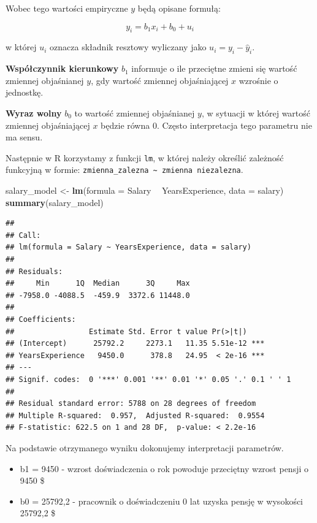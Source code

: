 \documentclass[
]{book}
\newenvironment{Shaded}{\begin{snugshade}}{\end{snugshade}}
\newcommand{\DataTypeTok}[1]{\textcolor[rgb]{0.13,0.29,0.53}{#1}}
\newcommand{\KeywordTok}[1]{\textcolor[rgb]{0.13,0.29,0.53}{\textbf{#1}}}
\newcommand{\NormalTok}[1]{#1}
\newcommand{\OperatorTok}[1]{\textcolor[rgb]{0.81,0.36,0.00}{\textbf{#1}}}
\newcommand{\StringTok}[1]{\textcolor[rgb]{0.31,0.60,0.02}{#1}}
\providecommand{\tightlist}{%
  \setlength{\itemsep}{0pt}\setlength{\parskip}{0pt}}
\begin{document}
Wobec tego wartości empiryczne \(y\) będą opisane formułą:

\[y_{i}=b_{1}x_{i}+b_{0}+u_{i}\]

w której \(u_i\) oznacza składnik resztowy wyliczany jako \(u_{i}=y_{i}-\hat{y}_{i}\).

\textbf{Współczynnik kierunkowy} \(b_1\) informuje o ile przeciętne zmieni się wartość zmiennej objaśnianej \(y\), gdy wartość zmiennej objaśniającej \(x\) wzrośnie o jednostkę.

\textbf{Wyraz wolny} \(b_0\) to wartość zmiennej objaśnianej \(y\), w sytuacji w której wartość zmiennej objaśniającej \(x\) będzie równa 0. Często interpretacja tego parametru nie ma sensu.

Następnie w R korzystamy z funkcji \texttt{lm}, w której należy określić zależność funkcyjną w formie: \texttt{zmienna\_zalezna\ \textasciitilde{}\ zmienna\ niezalezna}.

\begin{Shaded}
\begin{Highlighting}[]
\NormalTok{salary_model <-}\StringTok{ }\KeywordTok{lm}\NormalTok{(}\DataTypeTok{formula =}\NormalTok{ Salary }\OperatorTok{~}\StringTok{ }\NormalTok{YearsExperience, }\DataTypeTok{data =}\NormalTok{ salary)}
\KeywordTok{summary}\NormalTok{(salary_model)}
\end{Highlighting}
\end{Shaded}

\begin{verbatim}
## 
## Call:
## lm(formula = Salary ~ YearsExperience, data = salary)
## 
## Residuals:
##     Min      1Q  Median      3Q     Max 
## -7958.0 -4088.5  -459.9  3372.6 11448.0 
## 
## Coefficients:
##                 Estimate Std. Error t value Pr(>|t|)    
## (Intercept)      25792.2     2273.1   11.35 5.51e-12 ***
## YearsExperience   9450.0      378.8   24.95  < 2e-16 ***
## ---
## Signif. codes:  0 '***' 0.001 '**' 0.01 '*' 0.05 '.' 0.1 ' ' 1
## 
## Residual standard error: 5788 on 28 degrees of freedom
## Multiple R-squared:  0.957,  Adjusted R-squared:  0.9554 
## F-statistic: 622.5 on 1 and 28 DF,  p-value: < 2.2e-16
\end{verbatim}

Na podstawie otrzymanego wyniku dokonujemy interpretacji parametrów.

\begin{itemize}
\tightlist
\item
  b1 = 9450 - wzrost doświadczenia o rok powoduje przeciętny wzrost pensji o 9450 \$
\item
  b0 = 25792,2 - pracownik o doświadczeniu 0 lat uzyska pensję w wysokości 25792,2 \$
\end{itemize}
\end{document}
